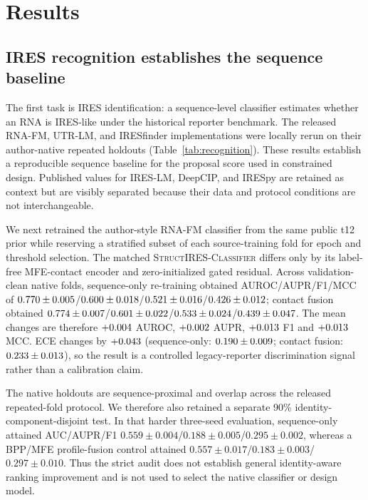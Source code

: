 \section{Results}

\subsection{IRES recognition establishes the sequence baseline}
The first task is IRES identification: a sequence-level classifier estimates
whether an RNA is IRES-like under the historical reporter benchmark. The
released RNA-FM, UTR-LM, and IRESfinder implementations were locally rerun on
their author-native repeated holdouts (Table~\ref{tab:recognition}). These
results establish a reproducible sequence baseline for the proposal score used
in constrained design. Published values for IRES-LM, DeepCIP, and IRESpy are
retained as context but are visibly separated because their data and protocol
conditions are not interchangeable.

We next retrained the author-style RNA-FM classifier from the same public t12
prior while reserving a stratified subset of each source-training fold for
epoch and threshold selection. The matched \textsc{StructIRES-Classifier}
differs only by its label-free MFE-contact encoder and zero-initialized gated
residual. Across \StructIRESNativeFoldCount validation-clean native folds,
sequence-only re-training obtained AUROC/AUPR/F1/MCC of
$0.770\pm0.005$/$0.600\pm0.018$/$0.521\pm0.016$/$0.426\pm0.012$;
contact fusion obtained
$0.774\pm0.007$/$0.601\pm0.022$/$0.533\pm0.024$/$0.439\pm0.047$.
The mean changes are therefore $+0.004$ AUROC,
$+0.002$ AUPR, $+0.013$ F1 and
$+0.013$ MCC. ECE changes by $+0.043$
(sequence-only: $0.190\pm0.009$; contact fusion:
$0.233\pm0.013$), so the result is a controlled
legacy-reporter discrimination signal rather than a calibration claim.

The native holdouts are sequence-proximal and overlap across the released
repeated-fold protocol. We therefore also retained a separate 90\%
identity-component-disjoint test. In that harder three-seed evaluation,
sequence-only attained AUC/AUPR/F1
$0.559\pm0.004$/$0.188\pm0.005$/$0.295\pm0.002$, whereas a BPP/MFE
profile-fusion control attained
$0.557\pm0.017$/$0.183\pm0.003$/$0.297\pm0.010$. Thus the strict audit does
not establish general identity-aware ranking improvement and is not used to
select the native classifier or design model.


